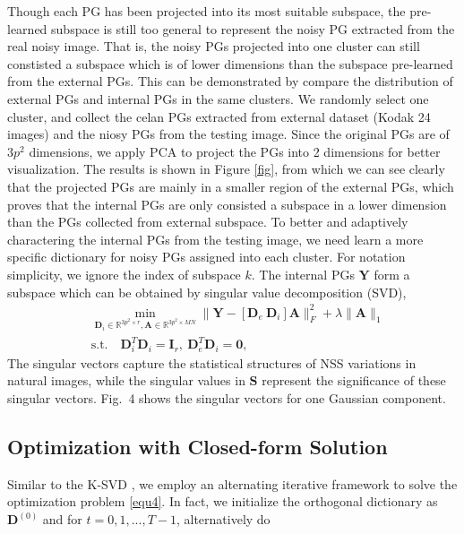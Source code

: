 \documentclass[10pt,twocolumn,letterpaper]{article}
\begin{document}
Though each PG has been projected into its most suitable subspace, the pre-learned subspace is still too general to represent the noisy PG extracted from the real noisy image. That is, the noisy PGs projected into one cluster can still constisted a subspace which is of lower dimensions than the subspace pre-learned from the external PGs. This can be demonstrated by compare the distribution of external PGs and internal PGs in the same clusters. We randomly select one cluster, and collect the celan PGs extracted from external dataset (Kodak 24 images) and the niosy PGs from the testing image. Since the original PGs are of $3p^{2}$ dimensions, we apply PCA to project the PGs into 2 dimensions for better visualization. The results is shown in Figure \ref{fig}, from which we can see clearly that the projected PGs are mainly in a smaller region of the external PGs, which proves that the internal PGs are only consisted a subspace in a lower dimension than the PGs collected from external subspace. To better and adaptively charactering the internal PGs from the testing image, we need learn a more specific dictionary for noisy PGs assigned into each cluster. For notation simplicity, we ignore the index of subspace $k$. The internal PGs $\mathbf{Y}$ form a subspace which can be obtained by singular value decomposition (SVD),
\begin{equation}\label{equ4}
\begin{split}
&\min_{\mathbf{D}_{i}\in \mathbb{R}^{3p^2\times r},\textbf{A}\in\mathbb{R}^{3p^2\times MN}}
\|\mathbf{Y}-[\mathbf{D}_{e}\ \mathbf{D}_{i}]\mathbf{A}\|_{F}^{2}+\lambda\|\mathbf{A}\|_{1}
\\
&
\text{s.t.}
\quad
\mathbf{D}_{i}^{T}\mathbf{D}_{i} = \mathbf{I}_{r},\ \mathbf{D}_{e}^{T}\mathbf{D}_{i} = \mathbf{0},
\end{split}
\end{equation}
The singular vectors capture the statistical structures of NSS variations in natural images, while the singular values in $\mathbf{S}$ represent the significance of these singular vectors. Fig.\ 4 shows the singular vectors for one Gaussian component.

\subsection{Optimization with Closed-form Solution}
Similar to the K-SVD \cite{ksvd}, we employ an alternating iterative framework to solve the optimization problem \ref{equ4}. In fact, we initialize the orthogonal dictionary as $\mathbf{D}^{(0)}$ and for $t=0, 1, ..., T-1$, alternatively do
\end{document}
